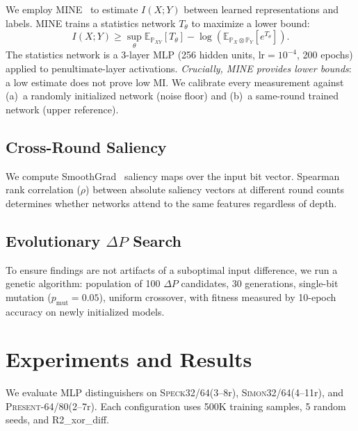 \documentclass[runningheads]{llncs}
\newcommand{\speck}{\textsc{Speck32/64}\xspace}
\newcommand{\simon}{\textsc{Simon32/64}\xspace}
\newcommand{\present}{\textsc{Present-64/80}\xspace}
\begin{document}
We employ MINE~\cite{belghazi2018mine} to estimate $I(X; Y)$ between learned representations and labels.
MINE trains a statistics network $T_\theta$ to maximize a lower bound:
\begin{equation}
\label{eq:mine}
I(X; Y) \ge \sup_{\theta} \mathbb{E}_{\mathbb{P}_{XY}}[T_\theta] - \log\!\left(\mathbb{E}_{\mathbb{P}_X \otimes \mathbb{P}_Y}[e^{T_\theta}]\right).
\end{equation}
The statistics network is a 3-layer MLP (256 hidden units, $\text{lr} = 10^{-4}$, 200 epochs) applied to penultimate-layer activations.
\emph{Crucially, MINE provides lower bounds}: a low estimate does not prove low MI.
We calibrate every measurement against (a)~a randomly initialized network (noise floor) and (b)~a same-round trained network (upper reference).

\subsection{Cross-Round Saliency}

We compute SmoothGrad~\cite{smilkov2017smoothgrad} saliency maps over the input bit vector.
Spearman rank correlation ($\rho$) between absolute saliency vectors at different round counts determines whether networks attend to the same features regardless of depth.

\subsection{Evolutionary $\Delta P$ Search}

To ensure findings are not artifacts of a suboptimal input difference, we run a genetic algorithm: population of 100 $\Delta P$ candidates, 30 generations, single-bit mutation ($p_{\text{mut}} = 0.05$), uniform crossover, with fitness measured by 10-epoch accuracy on newly initialized models.


\section{Experiments and Results}
\label{sec:experiments}

We evaluate MLP distinguishers on \speck (3--8r), \simon (4--11r), and \present (2--7r).
Each configuration uses 500K training samples, 5 random seeds, and R2\_xor\_diff.
\end{document}
